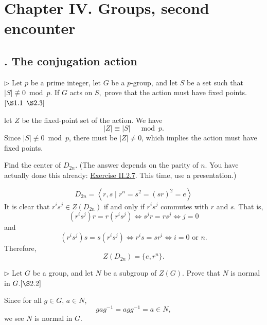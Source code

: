 \documentclass[12pt,letterpaper,boxed]{hmcpset}
\begin{document}
\newpage
\section{Chapter IV.\hspace{0.2em} Groups, second encounter}
\subsection{. The conjugation action}
\begin{problem}[1.1]
	$\triangleright$ Let $p$ be a prime integer, let $G$ be a $p$-group, and let $S$ be a set such that $|S| \not \equiv 0 \bmod p .$ If $G$ acts on $S,$ prove that the action must have fixed points. $[\S 1.1$ $\S 2.3]$
\end{problem}
\begin{solution}
	let $Z$ be the fixed-point set of the action. We have
	\[
	|Z| \equiv|S| \quad \bmod p.
	\]
	Since $|S| \not \equiv 0 \bmod p$, there must be $|Z|\ne0$, which implies the action must have fixed points.
\end{solution}

\begin{problem}[1.2]
Find the center of $D_{2 n}$. (The answer depends on the parity of $n$. You have actually done this already: \hyperlink{Exercise II.2.7}{Exercise II.2.7}. This time, use a presentation.)
\end{problem}
\begin{solution}
\[
D_{2n}=\left\langle r, s \mid r^{n}=s^{2}=(sr)^{2}=e\right\rangle
\]
It is clear that $r^is^j\in Z(D_{2n})$ if and only if $r^is^j$ commutes with $r$ and $s$. That is,
\[
(r^is^j)r=r(r^is^j)\iff s^jr=rs^j\iff j=0
\]
and
\[
(r^is^j)s=s(r^is^j)\iff r^is=sr^i\iff i=0\text{  or  }n.
\]
Therefore, 
\[
Z(D_{2n})=\{e,r^n\}.
\]
\end{solution}

\begin{problem}[1.4]
$\triangleright$ Let $G$ be a group, and let $N$ be a subgroup of $Z(G)$. Prove that $N$ is normal in $G .[\S 2.2]$
\end{problem}
\begin{solution}
Since for all $g\in G$, $a\in N$,
\[
gag^{-1}=agg^{-1}=a\in N,
\]
we see $N$ is normal in $G$.

\end{solution}
\end{document}
